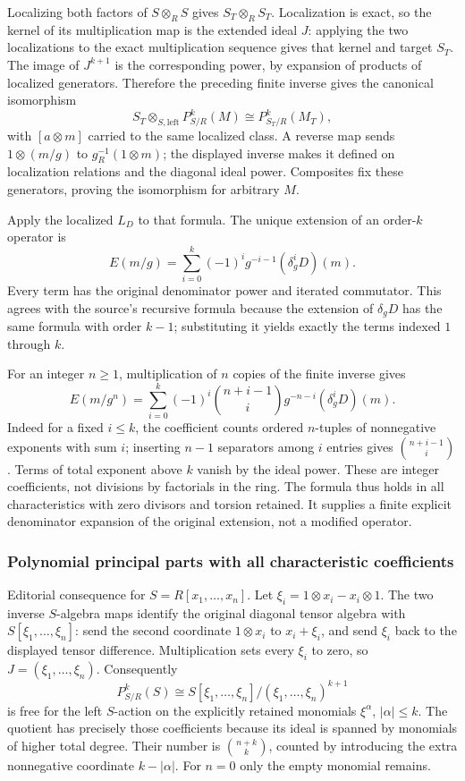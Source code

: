 Localizing both factors of \(S\otimes_RS\) gives \(S_T\otimes_RS_T\). Localization is exact, so the kernel of its multiplication map is the extended ideal \(J\): applying the two localizations to the exact multiplication sequence gives that kernel and target \(S_T\). The image of \(J^{k+1}\) is the corresponding power, by expansion of products of localized generators. Therefore the preceding finite inverse gives the canonical isomorphism \[
S_T\otimes_{S,\mathrm{left}}P^k_{S/R}(M)
\cong P^k_{S_T/R}(M_T),
\] with \([a\otimes m]\) carried to the same localized class. A reverse map sends \(1\otimes(m/g)\) to \(g_R^{-1}(1\otimes m)\); the displayed inverse makes it defined on localization relations and the diagonal ideal power. Composites fix these generators, proving the isomorphism for arbitrary \(M\).

Apply the localized \(L_D\) to that formula. The unique extension of an order-\(k\) operator is \[
E(m/g)=\sum_{i=0}^k(-1)^i g^{-i-1}(\delta_g^iD)(m).
\] Every term has the original denominator power and iterated commutator. This agrees with the source's recursive formula because the extension of \(\delta_gD\) has the same formula with order \(k-1\); substituting it yields exactly the terms indexed \(1\) through \(k\).

For an integer \(n\ge1\), multiplication of \(n\) copies of the finite inverse gives \[
E(m/g^n)=\sum_{i=0}^k(-1)^i\binom{n+i-1}{i}g^{-n-i}(\delta_g^iD)(m).
\] Indeed for a fixed \(i\le k\), the coefficient counts ordered \(n\)-tuples of nonnegative exponents with sum \(i\); inserting \(n-1\) separators among \(i\) entries gives \(\binom{n+i-1}{i}\). Terms of total exponent above \(k\) vanish by the ideal power. These are integer coefficients, not divisions by factorials in the ring. The formula thus holds in all characteristics with zero divisors and torsion retained. It supplies a finite explicit denominator expansion of the original extension, not a modified operator.

\subsubsection{Polynomial principal parts with all characteristic coefficients}\label{polynomial-principal-parts-with-all-characteristic-coefficients}

Editorial consequence for \(S=R[x_1,\ldots,x_n]\). Let \(\xi_i=1\otimes x_i-x_i\otimes1\). The two inverse \(S\)-algebra maps identify the original diagonal tensor algebra with \(S[\xi_1,\ldots,\xi_n]\): send the second coordinate \(1\otimes x_i\) to \(x_i+\xi_i\), and send \(\xi_i\) back to the displayed tensor difference. Multiplication sets every \(\xi_i\) to zero, so \(J=(\xi_1,\ldots,\xi_n)\). Consequently \[
P^k_{S/R}(S)\cong S[\xi_1,\ldots,\xi_n]/(\xi_1,\ldots,\xi_n)^{k+1}
\] is free for the left \(S\)-action on the explicitly retained monomials \(\xi^\alpha\), \(|\alpha|\le k\). The quotient has precisely those coefficients because its ideal is spanned by monomials of higher total degree. Their number is \(\binom{n+k}{k}\), counted by introducing the extra nonnegative coordinate \(k-|\alpha|\). For \(n=0\) only the empty monomial remains.

